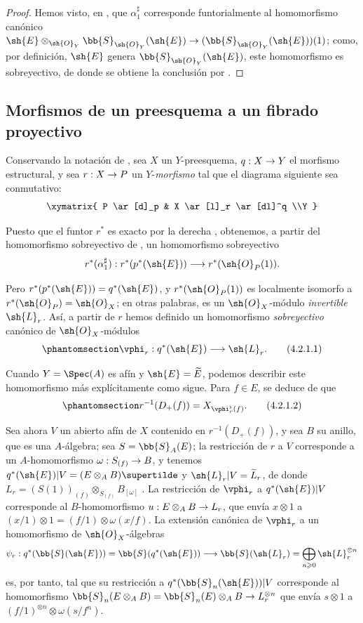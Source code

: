 \documentclass[oneside,10pt]{amsart}
\makeatletter
\renewcommand{\geq}{\geqslant}
\newcommand{\ega@arrow}[2]{\mathchoice{#1}{#2}{#2}{#2}}
\renewcommand{\to}{\ega@arrow{\longrightarrow}{\rightarrow}}
\newcommand{\oldpage}[2][]{\marginnote{\normalfont\footnotesize\textbf{#1}~|~#2}\ignorespaces}
\let\EGAOriginalLabel\label
\renewcommand{\label}[1]{\phantomsection\EGAOriginalLabel{#1}}
\makeatother
\begin{document}
\begin{proof}
Hemos visto, en , que $\alpha_1^\sharp$ corresponde funtorialmente al homomorfismo canónico $\sh{E}\otimes_{\sh{O}_Y}\bb{S}_{\sh{O}_Y}(\sh{E})\to(\bb{S}_{\sh{O}_Y}(\sh{E}))(1)$;
como, por definición, $\sh{E}$ genera $\bb{S}_{\sh{O}_Y}(\sh{E})$, este homomorfismo es sobreyectivo, de donde se obtiene la conclusión por .
\end{proof}

\subsection{Morfismos de un preesquema a un fibrado proyectivo}
\label{subsection:II.4.2}

\begin{env}[4.2.1]
\label{II.4.2.1}
Conservando la notación de , sea $X$ un $Y$-preesquema, $q:X\to Y$ el morfismo estructural, y sea $r:X\to P$ un $Y$-\emph{morfismo} tal que el diagrama siguiente sea conmutativo:
\[
  \xymatrix{
    P \ar[d]_p & X \ar[l]_r \ar[dl]^q
  \\Y
  }
\]
\oldpage[II]{73}

Puesto que el funtor $r^*$ es exacto por la derecha , obtenemos, a partir del homomorfismo sobreyectivo de , un homomorfismo sobreyectivo
\[
  r^*(\alpha_1^\sharp): r^*(p^*(\sh{E})) \to r^*(\sh{O}_P(1)).
\]

Pero $r^*(p^*(\sh{E}))=q^*(\sh{E})$, y $r^*(\sh{O}_P(1))$ es localmente isomorfo a $r^*(\sh{O}_P)=\sh{O}_X$; en otras palabras, es un $\sh{O}_X$-módulo \emph{invertible} $\sh{L}_r$.
Así, a partir de $r$ hemos definido un homomorfismo \emph{sobreyectivo} canónico de $\sh{O}_X$-módulos
\[
\label{II.4.2.1.1}
  \vphi_r:q^*(\sh{E}) \to \sh{L}_r.
  \tag{4.2.1.1}
\]

Cuando $Y=\Spec(A)$ es afín y $\sh{E}=\widetilde{E}$, podemos describir este homomorfismo más explícitamente como sigue.
Para $f\in E$, se deduce de  que
\[
\label{II.4.2.1.2}
  r^{-1}(D_+(f)) = X_{\vphi_r^\flat(f)}.
  \tag{4.2.1.2}
\]

Sea ahora $V$ un abierto afín de $X$ contenido en $r^{-1}(D_+(f))$, y sea $B$ su anillo, que es una $A$-álgebra;
sea $S=\bb{S}_A(E)$;
la restricción de $r$ a $V$ corresponde a un $A$-homomorfismo $\omega:S_{(f)}\to B$, y tenemos $q^*(\sh{E})|V=(E\otimes_A B)\supertilde$ y $\sh{L}_r|V=\widetilde L_r$, de donde $L_r=(S(1))_{(f)}\otimes_{S_{(f)}}B_{[\omega]}$ .
La restricción de $\vphi_r$ a $q^*(\sh{E})|V$ corresponde al $B$-homomorfismo $u:E\otimes_A B\to L_r$, que envía $x\otimes1$ a $(x/1)\otimes1=(f/1)\otimes\omega(x/f)$.
La extensión canónica de $\vphi_r$ a un homomorfismo de $\sh{O}_X$-álgebras
\[
  \psi_r:q^*(\bb{S}(\sh{E}))=\bb{S}(q^*(\sh{E}))\to\bb{S}(\sh{L}_r)=\bigoplus_{n\geq0}\sh{L}_r^{\otimes n}
\]
es, por tanto, tal que su restricción a $q^*(\bb{S}_n(\sh{E}))|V$ corresponde al homomorfismo
$\bb{S}_n(E\otimes_A B)=\bb{S}_n(E)\otimes_A B\to L_r^{\otimes n}$ que envía $s\otimes1$ a $(f/1)^{\otimes n}\otimes\omega(s/f^n)$.
\end{env}
\end{document}
